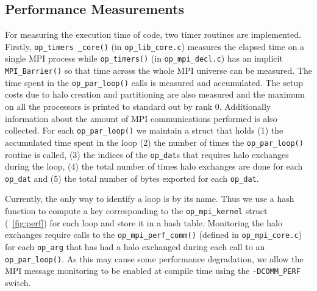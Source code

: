 \documentclass[11pt]{article}
\begin{document}
\subsection{Performance Measurements}\label{subsec/perf}

For measuring the execution time of code, two timer routines are implemented. Firstly, \texttt{op\_timers \_core()}
(in \texttt{op\_lib\_core.c}) measures the elapsed time on a single MPI process while \texttt{op\_timers()}
(in \texttt{op\_mpi\_decl.c}) has an implicit \texttt{MPI\_Barrier()} so that time across the whole MPI universe can be
measured. \noindent The time spent in the \texttt{op\_par\_loop()} calls is measured and accumulated. The setup costs
due to halo creation and partitioning are also measured and the maximum on all the processors is printed to standard out
by rank 0. Additionally information about the amount of MPI communications performed is also collected. For each
\texttt{op\_par\_loop()} we maintain a struct that holds (1) the accumulated time spent in the loop (2) the number of
times the \texttt{op\_par\_loop()} routine is called, (3) the indices of the \texttt{op\_dat}s that requires halo
exchanges during the loop, (4) the total number of times halo exchanges are done for each \texttt{op\_dat} and (5) the
total number of bytes exported for each \texttt{op\_dat}.

Currently, the only way to identify a loop is by its name. Thus we use a hash function to compute a key corresponding to
the \texttt{op\_mpi\_kernel} struct (\figurename{~\ref{fig:perf}}) for each loop and store it in a hash table.
Monitoring the halo exchanges require calls to the \texttt{op\_mpi\_perf\_comm()} (defined in \texttt{op\_mpi\_core.c})
for each \texttt{op\_arg} that has had a halo exchanged during each call to an \texttt{op\_par\_loop()}. As this may
cause some performance degradation, we allow the MPI message monitoring to be enabled at compile time using the
\texttt{-DCOMM\_PERF} switch.

\begin{comment}
\subsection{Output Routines}\label{subsec/output}
A number of miscellaneous output routines are provided currently, including
routines to output the performance measures, \texttt{op\_timing\_output()} as
well as file writes that directly writes an \texttt{op\_dat} to an ASCI file,
\texttt{gatherprint\_tofile()} or a binary file,
\texttt{gatherprint\_bin\_tofile()}. These routines gathers a
specified \texttt{op\_dat}, (which is distributed across the MPI universe) on to
MPI rank 0 and prints the results to a user specified file. The \texttt{op\_dat}
will be written to file in the same order in which the set elements were handed
to OP2 during the initial input of data and mapping tables. This requires calls
to \texttt{op\_fetch()}.
\end{comment}
\end{document}

